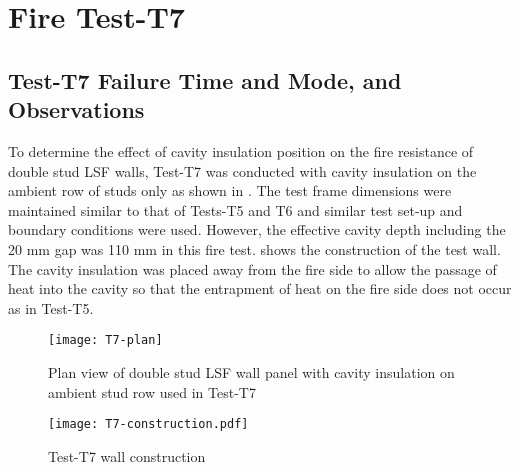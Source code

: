 \section{Fire Test-T7}
\subsection{Test-T7 Failure Time and Mode, and Observations}

To determine the effect of cavity insulation position on the fire resistance of double stud LSF walls, Test-T7 was conducted with cavity insulation on the ambient row of studs only as shown in . The test frame dimensions were maintained similar to that of Tests-T5 and T6 and similar test set-up and boundary conditions were used. However, the effective cavity depth including the 20 mm gap was 110 mm in this fire test.  shows the construction of the test wall. The cavity insulation was placed away from the fire side to allow the passage of heat into the cavity so that the entrapment of heat on the fire side does not occur as in Test-T5. 
\begin{figure}[!htbp]
	\centering
		\texttt{[image: T7-plan]}
		\caption{Plan view of double stud LSF wall panel with cavity insulation on ambient stud row used in Test-T7}
		\label{fig:T7-plan}
\end{figure}
\begin{figure}[htbp]
	\centering
	\texttt{[image: T7-construction.pdf]}
	\caption{Test-T7 wall construction}
	\label{fig:T7-construction}
\end{figure}


